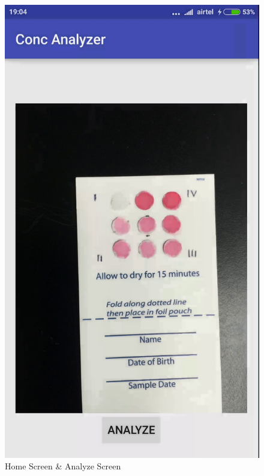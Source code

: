 \documentclass[runningheads,a4paper]{llncs}
\begin{document}
\begin{figure}[h!]
\begin{center}
\includegraphics[scale=0.12]{conc2}
\caption{Home Screen \& Analyze Screen}
\label{fig:scr1}
\end{center}
\end{figure}
\end{document}
